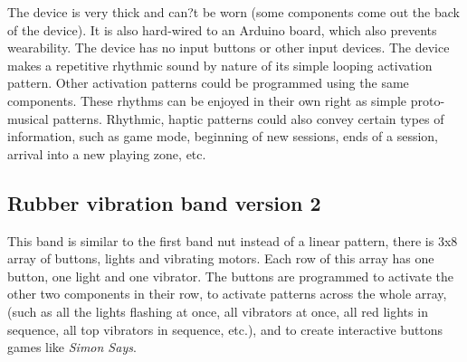 \documentclass{chi-ext}
\begin{document}
The device is very thick and can?t be worn (some components come out the back of the device). It is also hard-wired to an Arduino board, which also prevents wearability. The device has no input buttons or other input devices. The device makes a repetitive rhythmic sound by nature of its simple looping activation pattern. Other activation patterns could be programmed using the same components. These rhythms can be enjoyed in their own right as simple proto-musical patterns. Rhythmic, haptic patterns could also convey certain types of information, such as game mode, beginning of new sessions, ends of a session, arrival into a new playing zone, etc. 



\subsection{Rubber vibration band version 2}
This band is similar to the first band nut instead of a linear pattern, there is 3x8 array of buttons, lights and vibrating motors. Each row of this array has one button, one light and one vibrator. The buttons are programmed to activate the other two components in their row, to activate patterns across the whole array, (such as all the lights flashing at once, all vibrators at once, all red lights in sequence, all top vibrators in sequence, etc.), and to create interactive buttons games like \emph{Simon Says}.
\end{document}
